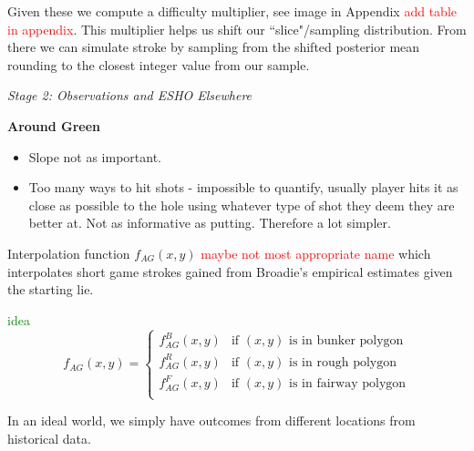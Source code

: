 \documentclass[11pt, letterpaper]{article}
\begin{document}
\begin{enumerate}
    Given these we compute a difficulty multiplier, see image in Appendix \textcolor{red}{add table in appendix}. This multiplier helps us shift our ``slice"/sampling distribution. From there we can simulate stroke by sampling from the shifted posterior mean rounding to the closest integer value from our sample.

\end{enumerate}



\emph{Stage 2: Observations and ESHO Elsewhere}

\textbf{Around Green}
\begin{itemize}
    \item Slope not as important. 
    \item Too many ways to hit shots - impossible to quantify, usually player hits it as close as possible to the hole using whatever type of shot they deem they are better at. Not as informative as putting. Therefore a lot simpler.
\end{itemize}

Interpolation function $f_{AG}(x,y)$ \textcolor{red}{maybe not most appropriate name} which interpolates short game strokes gained from Broadie's empirical estimates given the starting lie.

\textcolor{green}{idea}
\begin{equation}
f_{AG}(x,y) = \begin{cases}
   f_{AG}^B(x,y) & \text{if }(x,y) \text{ is in bunker polygon} \\
   f_{AG}^R(x,y) & \text{if }(x,y) \text{ is in rough polygon} \\
    f_{AG}^F(x,y) & \text{if }(x,y) \text{ is in fairway polygon} \\
\end{cases}
\end{equation}

In an ideal world, we simply have outcomes from different locations from historical data.
\end{document}
